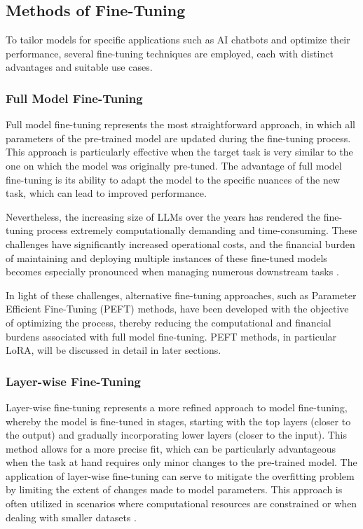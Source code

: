 \subsection{Methods of Fine-Tuning}

To tailor models for specific applications such as AI chatbots and optimize their performance, several fine-tuning techniques are employed, each with distinct advantages and suitable use cases.

\subsubsection{Full Model Fine-Tuning}

Full model fine-tuning represents the most straightforward approach, in which all parameters of the pre-trained model are updated during the fine-tuning process. This approach is particularly effective when the target task is very similar to the one on which the model was originally pre-tuned. The advantage of full model fine-tuning is its ability to adapt the model to the specific nuances of the new task, which can lead to improved performance.

Nevertheless, the increasing size of LLMs over the years has rendered the fine-tuning process extremely computationally demanding and time-consuming. These challenges have significantly increased operational costs, and the financial burden of maintaining and deploying multiple instances of these fine-tuned models becomes especially pronounced when managing numerous downstream tasks \cite{howard2018universal}.

In light of these challenges, alternative fine-tuning approaches, such as Parameter Efficient Fine-Tuning (PEFT) methods, have been developed with the objective of optimizing the process, thereby reducing the computational and financial burdens associated with full model fine-tuning. PEFT methods, in particular LoRA, will be discussed in detail in later sections.

\subsubsection{Layer-wise Fine-Tuning}

Layer-wise fine-tuning represents a more refined approach to model fine-tuning, whereby the model is fine-tuned in stages, starting with the top layers (closer to the output) and gradually incorporating lower layers (closer to the input). This method allows for a more precise fit, which can be particularly advantageous when the task at hand requires only minor changes to the pre-trained model. The application of layer-wise fine-tuning can serve to mitigate the overfitting problem by limiting the extent of changes made to model parameters. This approach is often utilized in scenarios where computational resources are constrained or when dealing with smaller datasets \cite{ro2021autolr}.

